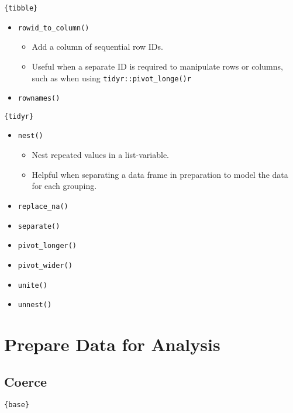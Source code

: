 \documentclass[
]{book}
\providecommand{\tightlist}{%
  \setlength{\itemsep}{0pt}\setlength{\parskip}{0pt}}
\begin{document}
\texttt{\{tibble\}}

\begin{itemize}
\tightlist
\item
  \texttt{rowid\_to\_column()}

  \begin{itemize}
  \tightlist
  \item
    Add a column of sequential row IDs.
  \item
    Useful when a separate ID is required to manipulate rows or columns, such as when using \texttt{tidyr::pivot\_longe()r}
  \end{itemize}
\item
  \texttt{rownames()}
\end{itemize}

\texttt{\{tidyr\}}

\begin{itemize}
\tightlist
\item
  \texttt{nest()}

  \begin{itemize}
  \tightlist
  \item
    Nest repeated values in a list-variable.
  \item
    Helpful when separating a data frame in preparation to model the data for each grouping.
  \end{itemize}
\item
  \texttt{replace\_na()}
\item
  \texttt{separate()}
\item
  \texttt{pivot\_longer()}
\item
  \texttt{pivot\_wider()}
\item
  \texttt{unite()}
\item
  \texttt{unnest()}
\end{itemize}

\hypertarget{prepare-data-for-analysis}{%
\section{Prepare Data for Analysis}\label{prepare-data-for-analysis}}

\hypertarget{coerce}{%
\subsection{Coerce}\label{coerce}}

\texttt{\{base\}}
\end{document}
